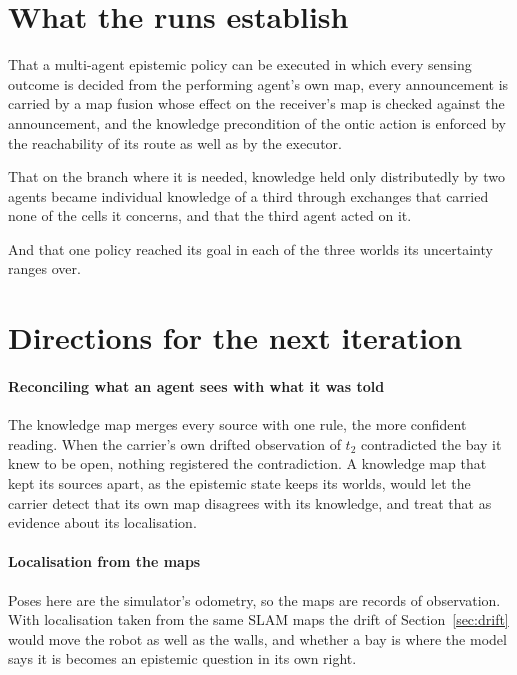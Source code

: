 \documentclass[11pt,a4paper]{article}
\theoremstyle{definition}
\begin{document}
\section{What the runs establish}
\label{sec:established}

That a multi-agent epistemic policy can be executed in which every sensing
outcome is decided from the performing agent's own map, every announcement is
carried by a map fusion whose effect on the receiver's map is checked against
the announcement, and the knowledge precondition of the ontic action is
enforced by the reachability of its route as well as by the executor.

That on the branch where it is needed, knowledge held only distributedly by two
agents became individual knowledge of a third through exchanges that carried
none of the cells it concerns, and that the third agent acted on it.

And that one policy reached its goal in each of the three worlds its
uncertainty ranges over.

\section{Directions for the next iteration}
\label{sec:notestablished}

\paragraph{Reconciling what an agent sees with what it was told} The knowledge
map merges every source with one rule, the more confident reading. When the
carrier's own drifted observation of $t_2$ contradicted the bay it knew to be
open, nothing registered the contradiction. A knowledge map that kept its
sources apart, as the epistemic state keeps its worlds, would let the carrier
detect that its own map disagrees with its knowledge, and treat that as
evidence about its localisation.

\paragraph{Localisation from the maps} Poses here are the simulator's odometry,
so the maps are records of observation. With localisation taken from the same
SLAM maps the drift of Section~\ref{sec:drift} would move the robot as well as
the walls, and whether a bay is where the model says it is becomes an
epistemic question in its own right.
\end{document}
